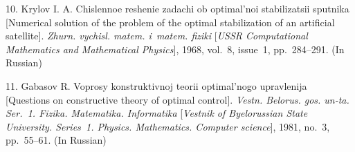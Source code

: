 {10. Krylov I. A. Chislennoe reshenie zadachi ob optimal'noi
stabilizatsii sputnika [Numerical solution of the problem of the
optimal stabilization of an artificial satellite].  {\it Zhurn.
vychisl. matem.  i~matem. fiziki} [\textit{USSR Computational
Mathematics and Mathematical Physics}], 1968, vol.~8, issue~1,
pp.~284--291. (In Russian)

11. Gabasov R. Voprosy konstruktivnoj teorii optimal'nogo
upravlenija [Questions on constructive theory of optimal control].
{\it Vestn. Belorus. gos. un-ta. Ser.~1. Fizika. Matematika.
Informatika} [\textit{Vestnik of Byelorussian State University.
Series~1. Physics. Mathematics. Computer science}], 1981, no.~3,
pp.~55--61. (In Russian)





}
